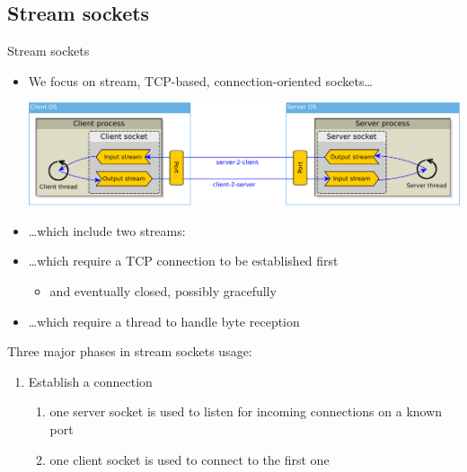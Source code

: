 \documentclass{beamer}\mode<presentation>{\usetheme{AMSBolognaFC}}
\begin{document}
\subsection{Stream sockets}

\begin{frame}[c, allowframebreaks]{Stream sockets}

    \begin{itemize}
        \item We focus on \alert{stream}, \alert{TCP}-based, \alert{connection-oriented} sockets\ldots
        \begin{center}
            \includegraphics[width=\linewidth]{img/sockets.pdf}
        \end{center}

        \smallskip

        \item \ldots which include two \alert{streams}:

        \smallskip

        \item \ldots which require a TCP connection to be \alert{established} first
        \begin{itemize}
            \item and eventually \alert{closed}, possibly gracefully
        \end{itemize}

        \smallskip

        \item \ldots which require a \alert{thread} to handle byte reception
    \end{itemize}

    \framebreak

    Three major phases in stream sockets usage:
    \bigskip
    \begin{enumerate}
        \item Establish a connection
        \begin{enumerate}
            \item one server socket is used to \alert{listen} for incoming connections on a known \alert{port}
            \item one client socket is used to \alert{connect} to the first one
        \end{enumerate}


\end{enumerate}
\end{frame}
\end{document}
